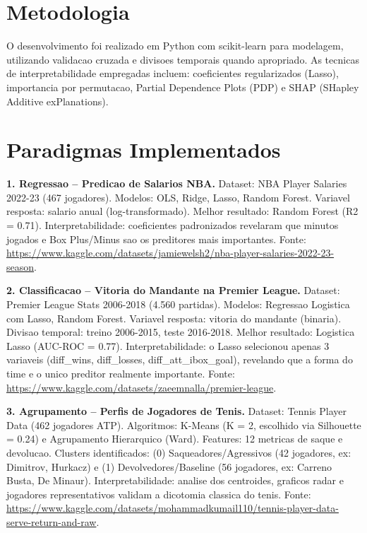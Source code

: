 \documentclass[10pt,a4paper]{article}
\begin{document}
\section*{Metodologia}

O desenvolvimento foi realizado em Python com scikit-learn para modelagem, utilizando validacao cruzada e divisoes temporais quando apropriado. As tecnicas de interpretabilidade empregadas incluem: coeficientes regularizados (Lasso), importancia por permutacao, Partial Dependence Plots (PDP) e SHAP (SHapley Additive exPlanations).

\section*{Paradigmas Implementados}

\textbf{1. Regressao -- Predicao de Salarios NBA.} Dataset: NBA Player Salaries 2022-23 (467 jogadores). Modelos: OLS, Ridge, Lasso, Random Forest. Variavel resposta: salario anual (log-transformado). Melhor resultado: Random Forest (R2 = 0.71). Interpretabilidade: coeficientes padronizados revelaram que minutos jogados e Box Plus/Minus sao os preditores mais importantes. Fonte: \url{https://www.kaggle.com/datasets/jamiewelsh2/nba-player-salaries-2022-23-season}.

\textbf{2. Classificacao -- Vitoria do Mandante na Premier League.} Dataset: Premier League Stats 2006-2018 (4.560 partidas). Modelos: Regressao Logistica com Lasso, Random Forest. Variavel resposta: vitoria do mandante (binaria). Divisao temporal: treino 2006-2015, teste 2016-2018. Melhor resultado: Logistica Lasso (AUC-ROC = 0.77). Interpretabilidade: o Lasso selecionou apenas 3 variaveis (diff\_wins, diff\_losses, diff\_att\_ibox\_goal), revelando que a forma do time e o unico preditor realmente importante. Fonte: \url{https://www.kaggle.com/datasets/zaeemnalla/premier-league}.

\textbf{3. Agrupamento -- Perfis de Jogadores de Tenis.} Dataset: Tennis Player Data (462 jogadores ATP). Algoritmos: K-Means (K = 2, escolhido via Silhouette = 0.24) e Agrupamento Hierarquico (Ward). Features: 12 metricas de saque e devolucao. Clusters identificados: (0) Saqueadores/Agressivos (42 jogadores, ex: Dimitrov, Hurkacz) e (1) Devolvedores/Baseline (56 jogadores, ex: Carreno Busta, De Minaur). Interpretabilidade: analise dos centroides, graficos radar e jogadores representativos validam a dicotomia classica do tenis. Fonte: \url{https://www.kaggle.com/datasets/mohammadkumail110/tennis-player-data-serve-return-and-raw}.
\end{document}
